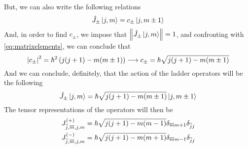 \documentclass[../qm.tex]{subfiles}
\begin{document}
	But, we can also write the following relations
	\begin{equation*}
		\hat{J}_{\pm}\ket{j,m}=c_{\pm}\ket{j,m\pm1}
	\end{equation*}
	And, in order to find $c_{\pm}$, we impose that $\norm{\hat{J}_{\pm}\ket{j,m}}=1$, and confronting with \eqref{eq:matrixelements}, we can conclude that
	\begin{equation}
		\abs{c_{\pm}}^2=\hbar^2\left( j(j+1)-m(m\pm1) \right)\longrightarrow c_{\pm}=\hbar\sqrt{j(j+1)-m(m\pm1)}
		\label{eq:cplusminus}
	\end{equation}
	And we can conclude, definitely, that the action of the ladder operators will be the following
	\begin{equation}
		\hat{J}_{\pm}\ket{j,m}=\hbar\sqrt{j(j+1)-m(m\pm1)}\ket{j,m\pm1}
		\label{eq:actionladopr}
	\end{equation}
	The tensor representations of the operators will then be
	\begin{equation}
		\begin{aligned}
			J_{\overline{j},\overline{m},j,m}^{(+)}&=\hbar\sqrt{j(j+1)-m(m-1)}\delta_{\overline{m}m+1}\delta_{\overline{j}j}\\
			J_{\overline{j},\overline{m},j,m}^{(-)}&=\hbar\sqrt{j(j+1)-m(m+1)}\delta_{\overline{m}m-1}\delta_{\overline{j}j}
		\end{aligned}
		\label{eq:tensorrepresentation}
	\end{equation}
\end{document}
